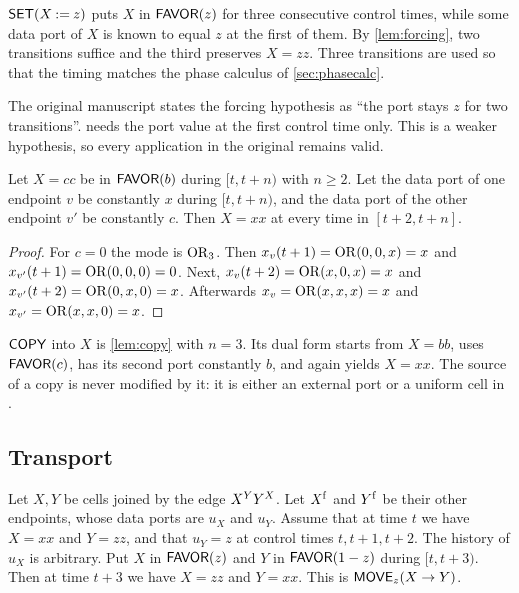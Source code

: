 \begin{definition}\label{def:set}
$\textsf{SET}(X\mathbin{:=}z)$ puts $X$ in $\textsf{FAVOR}(z)$ for three consecutive control times, while some data
port of $X$ is known to equal $z$ at the first of them. By \cref{lem:forcing}, two transitions
suffice and the third preserves $X=zz$. Three transitions are used so that the timing matches the
phase calculus of \cref{sec:phasecalc}.
\end{definition}

\begin{remark}\label{rem:forcing-hyp}
The original manuscript states the forcing hypothesis as ``the port stays $z$ for two transitions''.
 needs the port value at the first control time only. This is a weaker hypothesis,
so every application in the original remains valid.
\end{remark}

\begin{lemma}[Copy]\label{lem:copy}
Let $X=cc$ be in $\textsf{FAVOR}(b)$ during $[t,t+n)$ with $n\ge 2$. Let the data port of one endpoint
$v$ be constantly $x$ during $[t,t+n)$, and the data port of the other endpoint $v'$ be constantly
$c$. Then $X=xx$ at every time in $[t+2,t+n]$.
\end{lemma}

\begin{proof}
For $c=0$ the mode is $\operatorname{OR}_3$. Then $x_v(t+1)=\operatorname{OR}(0,0,x)=x$ and $x_{v'}(t+1)=\operatorname{OR}(0,0,0)=0$.
Next, $x_v(t+2)=\operatorname{OR}(x,0,x)=x$ and $x_{v'}(t+2)=\operatorname{OR}(0,x,0)=x$. Afterwards
$x_v=\operatorname{OR}(x,x,x)=x$ and $x_{v'}=\operatorname{OR}(x,x,0)=x$.
\end{proof}

$\textsf{COPY}$ into $X$ is \cref{lem:copy} with $n=3$. Its dual form starts from $X=bb$, uses
$\textsf{FAVOR}(c)$, has its second port constantly $b$, and again yields $X=xx$. The source of a copy is never
modified by it: it is either an external port or a uniform cell in \HOLD.

\subsection{Transport}

\begin{lemma}\label{lem:move}
Let $X,Y$ be cells joined by the edge $X^{Y}Y^{X}$. Let $X^{\mathrm f}$ and $Y^{\mathrm f}$ be
their other endpoints, whose data ports are $u_X$ and $u_Y$. Assume that at time $t$ we have
$X=xx$ and $Y=zz$, and that $u_Y=z$ at control times $t,t+1,t+2$. The history of $u_X$ is arbitrary.
Put $X$ in $\textsf{FAVOR}(z)$ and $Y$ in $\textsf{FAVOR}(1-z)$ during $[t,t+3)$. Then at time $t+3$ we have $X=zz$ and
$Y=xx$. This is $\textsf{MOVE}_z(X\to Y)$.
\end{lemma}

